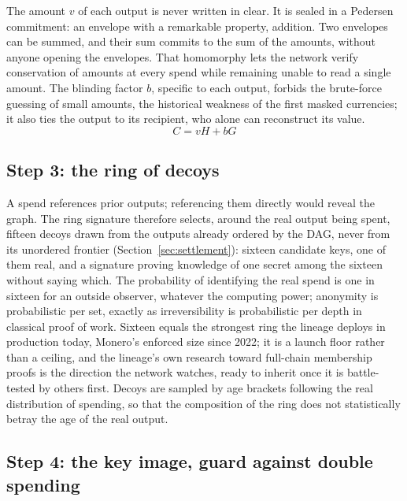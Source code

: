 The amount $v$ of each output is never written in clear. It is sealed in
a Pedersen commitment: an envelope with a remarkable property, addition.
Two envelopes can be summed, and their sum commits to the sum of the
amounts, without anyone opening the envelopes. That homomorphy lets the
network verify conservation of amounts at every spend while remaining
unable to read a single amount. The blinding factor $b$, specific to each
output, forbids the brute-force guessing of small amounts, the historical
weakness of the first masked currencies; it also ties the output to its
recipient, who alone can reconstruct its value.
\begin{equation}\label{eq:pedersen}
C = vH + bG
\end{equation}

\subsection{Step 3: the ring of decoys}

A spend references prior outputs; referencing them directly would reveal
the graph. The ring signature therefore selects, around the real output
being spent, fifteen decoys drawn from the outputs already ordered by the
DAG, never from its unordered frontier (Section~\ref{sec:settlement}):
sixteen candidate keys, one of them real, and a signature proving
knowledge of one secret among the sixteen without saying which. The
probability of identifying the real spend is one in sixteen for an outside
observer, whatever the computing power; anonymity is probabilistic per
set, exactly as irreversibility is probabilistic per depth in classical
proof of work. Sixteen equals the strongest ring the lineage deploys in
production today, Monero's enforced size since 2022; it is a launch floor
rather than a ceiling, and the lineage's own research toward
full-chain membership proofs is the direction the network watches, ready
to inherit once it is battle-tested by others first. Decoys are sampled
by age brackets following the real
distribution of spending, so that the composition of the ring does not
statistically betray the age of the real output.

\subsection{Step 4: the key image, guard against double spending}

